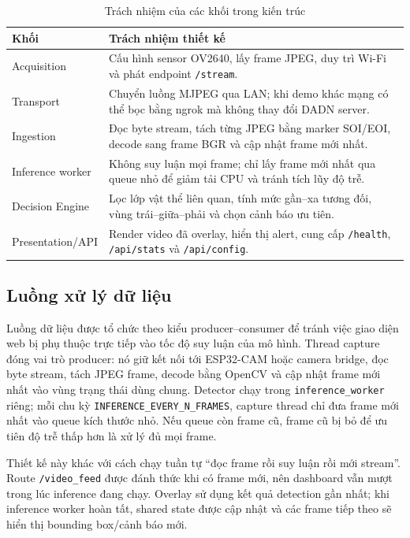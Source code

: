 \documentclass[oneside,final]{hcmut-report}
\begin{document}
\begin{table}[H]
  \centering
  \caption{Trách nhiệm của các khối trong kiến trúc}
  \label{tab:architecture-blocks}
  \small
  \begin{tabularx}{\textwidth}{L{3.1cm}Y}
    \toprule
    \textbf{Khối} & \textbf{Trách nhiệm thiết kế} \\
    \midrule
    Acquisition & Cấu hình sensor OV2640, lấy frame JPEG, duy trì Wi-Fi và phát endpoint \texttt{/stream}. \\
    Transport & Chuyển luồng MJPEG qua LAN; khi demo khác mạng có thể bọc bằng ngrok mà không thay đổi DADN server. \\
    Ingestion & Đọc byte stream, tách từng JPEG bằng marker SOI/EOI, decode sang frame BGR và cập nhật frame mới nhất. \\
    Inference worker & Không suy luận mọi frame; chỉ lấy frame mới nhất qua queue nhỏ để giảm tải CPU và tránh tích lũy độ trễ. \\
    Decision Engine & Lọc lớp vật thể liên quan, tính mức gần--xa tương đối, vùng trái--giữa--phải và chọn cảnh báo ưu tiên. \\
    Presentation/API & Render video đã overlay, hiển thị alert, cung cấp \texttt{/health}, \texttt{/api/stats} và \texttt{/api/config}. \\
    \bottomrule
  \end{tabularx}
\end{table}

\subsection{Luồng xử lý dữ liệu}
Luồng dữ liệu được tổ chức theo kiểu producer--consumer để tránh việc giao diện web bị phụ thuộc trực tiếp vào tốc độ suy luận của mô hình. Thread capture đóng vai trò producer: nó giữ kết nối tới ESP32-CAM hoặc camera bridge, đọc byte stream, tách JPEG frame, decode bằng OpenCV và cập nhật frame mới nhất vào vùng trạng thái dùng chung. Detector chạy trong \texttt{inference\_worker} riêng; mỗi chu kỳ \texttt{INFERENCE\_EVERY\_N\_FRAMES}, capture thread chỉ đưa frame mới nhất vào queue kích thước nhỏ. Nếu queue còn frame cũ, frame cũ bị bỏ để ưu tiên độ trễ thấp hơn là xử lý đủ mọi frame.

Thiết kế này khác với cách chạy tuần tự ``đọc frame rồi suy luận rồi mới stream''. Route \texttt{/video\_feed} được đánh thức khi có frame mới, nên dashboard vẫn mượt trong lúc inference đang chạy. Overlay sử dụng kết quả detection gần nhất; khi inference worker hoàn tất, shared state được cập nhật và các frame tiếp theo sẽ hiển thị bounding box/cảnh báo mới.
\end{document}
